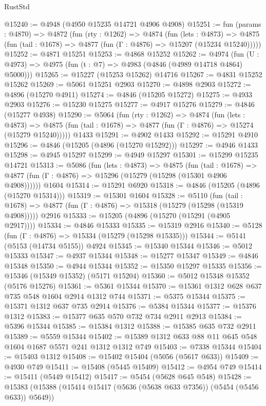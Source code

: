 \begin{lexlean}{RustStd}
\begin{coremodule}
@15240 := @4948 (@4950 @15235 @14721 @4906 @4908)
@15251 := fun (params : @4870) =>
  @4872
    (fun (rty : @1262) =>
    @4874
      (fun (lets : @4873) =>
      @4875 (fun (tail : @1678) => @4877 (fun (Γ : @4876) => @15207 (@15234 @15240)))))
@15252 := @4871 @15251
@15253 := @4868 @15252
@15262 := @4974
    (fun (U : @4973) => @4975 (fun (t : @7) => @4983 (@4846 (@4989 @14718 @4864) @5000)))
@15265 := @15227 (@15253 @15262) @14716
@15267 := @4831 @15252 @15262
@15269 := @5061 @15251 @2903
@15270 := @4898 @2903
@15272 := @4896 (@15270 @4911)
@15274 := @4846 (@15205 @15272)
@15275 := @4933 @2903
@15276 := @15230 @15275
@15277 := @4917 @15276
@15279 := @4846 (@15277 @4938)
@15290 := @5064
    (fun (rty : @1262) =>
    @4874
      (fun (lets : @4873) =>
      @4875 (fun (tail : @1678) => @4877 (fun (Γ : @4876) => @15274 (@15279 @15240)))))
    @1433
@15291 := @4902 @1433
@15292 := @15291 @4910
@15296 := @4846 (@15205 (@4896 (@15270 @15292)))
@15297 := @4946 @1433
@15298 := @4945 @15297
@15299 := @4949 @15297
@15301 := @15299 @15235 @14721
@15313 := @5086
    (fun (lets : @4873) =>
    @4875
      (fun (tail : @1678) =>
      @4877 (fun (Γ : @4876) => @15296 (@15279 (@15298 (@15301 @4906 @4908))))))
    @1604
@15314 := @15291 @6920
@15318 := @4846 (@15205 (@4896 (@15270 @15314)))
@15319 := @15301 @1604
@15328 := @5110
    (fun (tail : @1678) => @4877 (fun (Γ : @4876) => @15318 (@15279 (@15298 (@15319 @4908)))))
    @2916
@15333 := @15205 (@4896 (@15270 (@15291 (@4905 @2917))))
@15334 := @4846 @15333
@15335 := @15319 @2916
@15340 := @5128 (fun (Γ : @4876) => @15334 (@15279 (@15298 @15335)))
@15344 := @5141 (@5153 (@14734 @5155)) @4924
@15345 := @15340 @15344
@15346 := @5012 @15333
@15347 := @4937 @15344
@15348 := @15277 @15347
@15349 := @4846 @15348
@15350 := @4944 @15344
@15352 := @15350 @15297 @15335
@15356 := @15346 (@15349 @15352) (@5171 @15204)
@15360 := @5012 @15348 @15352 (@5176 @15276)
@15361 := @5361 @15344
@15370 := @15361 @1312 @628 @637 @735 @548 @1604 @2914 @1312 @744
@15371 := @5375 @15344
@15375 := @15371 @1312 @637 @735 @2914
@15376 := @5384 @15344
@15377 := @15376 @1312
@15383 := @15377 @635 @570 @732 @734 @2911 @2913
@15384 := @5396 @15344
@15385 := @15384 @1312
@15388 := @15385 @635 @732 @2911
@15389 := @5559 @15344
@15402 := @15389 @1312 @633 @88 @11 @645 @548 @1604 @1687 @5571 @241 @1312 @1312 @749
@15403 := @7338 @15344
@15404 := @15403 @1312
@15408 := @15402 @15404 (@5056 (@5617 @633))
@15409 := @4930 @749
@15411 := @15408 (@5445 @15409)
@15412 := @4954 @749
@15414 := @15411 (@5449 @15412)
@15417 := @5454 (@5628 @645 @548)
@15428 := @15383 (@15388 (@15414 @15417 (@5636 (@5638 @633 @7356)) (@5454 (@5456 @633)) @5649))

\end{coremodule}
\end{lexlean}
